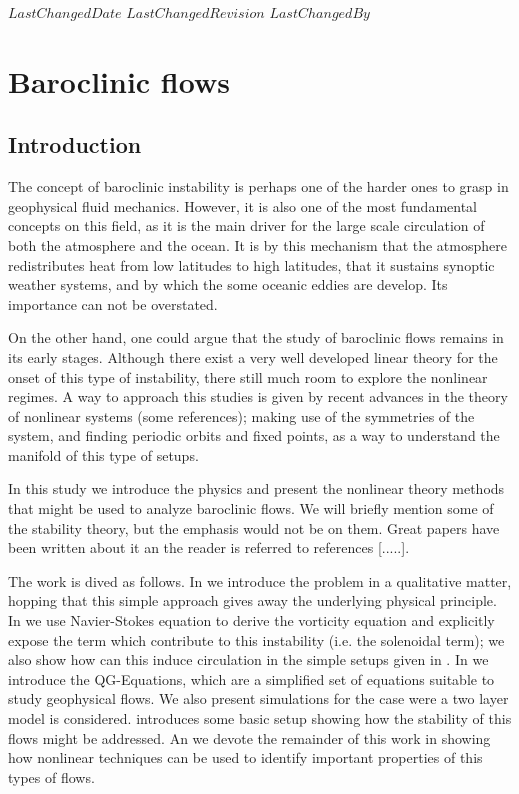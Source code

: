 {$LastChangedDate$}
{$LastChangedRevision$} {$LastChangedBy$}

\chapter{Baroclinic flows}
\label{chap:baroclinic}

\section{Introduction}
\label{s:intro}
The concept of baroclinic instability is perhaps one of the harder ones
to grasp in geophysical fluid mechanics. However, it is also one of the
most fundamental concepts on this field, as it is the main driver for the
large scale circulation of both the atmosphere and the ocean. It is by this
mechanism that the atmosphere redistributes heat from low latitudes to
high latitudes, that it sustains synoptic weather systems, and by which
the some oceanic eddies are develop. Its importance can not be
overstated.

On the other hand, one could argue that the study of baroclinic flows
remains in its early stages. Although there exist a very well developed
linear theory for the onset of this type of instability, there still much
room to explore the nonlinear regimes. A way to approach this studies is
given by recent advances in the theory of nonlinear systems (some
references); making use of the symmetries of the system, and finding
periodic orbits and fixed points, as a way to understand the manifold of
this type of setups.

In this study we introduce the physics and present the nonlinear theory
methods that might be used to analyze baroclinic flows. We will briefly
mention some of the stability theory, but the emphasis would not be on
them. Great papers have been written about it an the reader is referred
to references [.....].

The work is dived as follows. In  we introduce the
problem in a qualitative matter, hopping that this simple approach gives
away the underlying physical principle. In  we
use Navier-Stokes equation to derive the vorticity equation and
explicitly expose the term which contribute to this instability (i.e. the
solenoidal term); we also show how can this induce circulation in the
simple setups given in . In  we
introduce the QG-Equations, which are a simplified set of equations
suitable to study geophysical flows. We also present simulations for the
case were a two layer model is considered.  
introduces some basic setup showing how the stability of this flows might
be addressed. An we devote the remainder of this work in showing how
nonlinear techniques can be used to identify important properties of this
types of flows.

